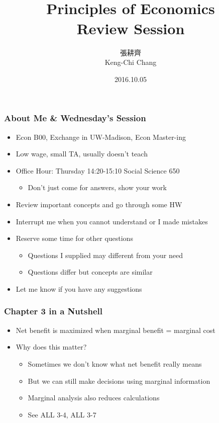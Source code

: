 \documentclass[12pt, xcolor=dvipsnames]{beamer}
\title{\bf{\Huge {}\\[-2mm] Principles of Economics \\[2mm] Review Session}}
\author{{\Large 張耕齊\\[2mm] Keng-Chi Chang}}
\institute{{}\\[-7mm]\footnotesize\tt{<r03323070@ntu.edu.tw>}\\[2mm]}
\date{\large 2016.10.05}
\begin{document}
\fontsize{12}{14pt}\selectfont


\begin{frame}
\titlepage
\end{frame}


\begin{frame}
\frametitle{\bf About Me \& Wednesday's Session}
\begin{itemize}
\item Econ B00, Exchange in UW-Madison, Econ Master-ing
\item Low wage, small TA, usually doesn't teach
\item Office Hour: Thursday 14:20-15:10 Social Science 650
\begin{itemize}
\item Don't just come for answers, show your work
\end{itemize}
\item Review important concepts and go through some HW
\item Interrupt me when you cannot understand or I made mistakes
\item Reserve some time for other questions
\begin{itemize}
\item Questions I supplied may different from your need
\item Questions differ but concepts are similar
\end{itemize}
\item Let me know if you have any suggestions
\end{itemize}
\end{frame}


\begin{frame}
\frametitle{\bf Chapter 3 in a Nutshell}
\begin{itemize}
\item Net benefit is maximized when marginal benefit = marginal cost
\item Why does this matter? 
\begin{itemize}
\item Sometimes we don't know what net benefit really means
\item But we can still make decisions using marginal information
\item Marginal analysis also reduces calculations
\item See ALL 3-4, ALL 3-7
\end{itemize}
\end{itemize}
\end{frame}
\end{document}
